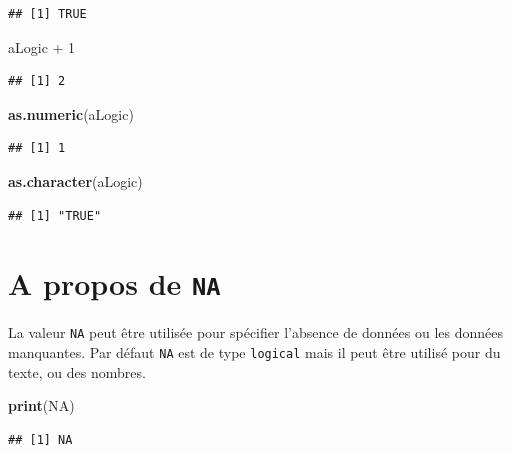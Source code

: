 \documentclass[twoside,symmetric]{book}
\newenvironment{Shaded}{}{}
\newcommand{\DecValTok}[1]{#1}
\newcommand{\KeywordTok}[1]{\textbf{#1}}
\newcommand{\NormalTok}[1]{#1}
\newcommand{\OperatorTok}[1]{#1}
\newcommand{\OtherTok}[1]{#1}
\newcommand{\StringTok}[1]{#1}
\begin{document}
\begin{verbatim}
## [1] TRUE
\end{verbatim}

\begin{Shaded}
\begin{Highlighting}[]
\NormalTok{aLogic }\OperatorTok{+}\StringTok{ }\DecValTok{1}
\end{Highlighting}
\end{Shaded}

\begin{verbatim}
## [1] 2
\end{verbatim}

\begin{Shaded}
\begin{Highlighting}[]
\KeywordTok{as.numeric}\NormalTok{(aLogic)}
\end{Highlighting}
\end{Shaded}

\begin{verbatim}
## [1] 1
\end{verbatim}

\begin{Shaded}
\begin{Highlighting}[]
\KeywordTok{as.character}\NormalTok{(aLogic)}
\end{Highlighting}
\end{Shaded}

\begin{verbatim}
## [1] "TRUE"
\end{verbatim}

\hypertarget{a-propos-de-na}{%
\section{\texorpdfstring{A propos de \texttt{NA}}{A propos de NA}}\label{a-propos-de-na}}

La valeur \texttt{NA} peut être utilisée pour spécifier l'absence de données ou les données manquantes. Par défaut \texttt{NA} est de type \texttt{logical} mais il peut être utilisé pour du texte, ou des nombres.

\begin{Shaded}
\begin{Highlighting}[]
\KeywordTok{print}\NormalTok{(}\OtherTok{NA}\NormalTok{)}
\end{Highlighting}
\end{Shaded}

\begin{verbatim}
## [1] NA
\end{verbatim}
\end{document}
